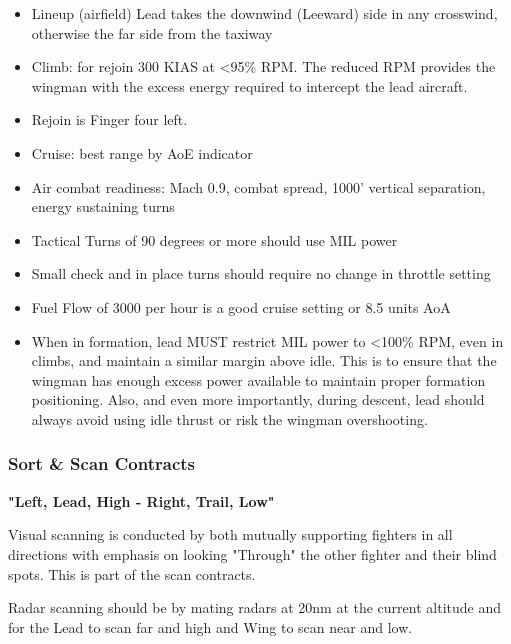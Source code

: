 \begin{itemize}
  \item Lineup (airfield) Lead takes the downwind (Leeward) side in any
    crosswind, otherwise the far side from the taxiway

  \item Climb: for rejoin 300 KIAS at <95\% RPM. The reduced RPM
  provides the
    wingman with the excess energy required to intercept the lead aircraft.

  \item Rejoin is Finger four left.

  \item Cruise: best range by AoE indicator

  \item Air combat readiness: Mach 0.9, combat spread, 1000' vertical
    separation, energy sustaining turns

  \item Tactical Turns of 90 degrees or more should use MIL power

  \item Small check and in place turns should require no change in throttle
    setting

  \item Fuel Flow of 3000 per hour is a good cruise setting or 8.5 units AoA

  \item When in formation, lead MUST restrict MIL power to <100\% RPM, even in
    climbs, and maintain a similar margin above idle. This is to ensure that
    the wingman has enough excess power available to maintain proper formation
    positioning. Also, and even more importantly, during descent, lead should
    always avoid using idle thrust or risk the wingman overshooting.

\end{itemize}

\subsubsection{Sort \& Scan Contracts}

\textbf{"Left, Lead, High - Right, Trail, Low"}

Visual scanning is conducted by both mutually supporting fighters in all
directions with emphasis on looking "Through" the other fighter and their blind
spots. This is part of the scan contracts.

Radar scanning should be by mating radars at 20nm at the current altitude and
for the Lead to scan far and high and Wing to scan near and low.

